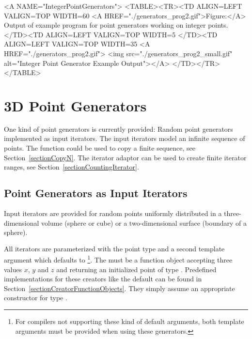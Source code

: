 
\begin{ccHtmlOnly}
  <A NAME="IntegerPointGenerators">
  <TABLE><TR><TD ALIGN=LEFT VALIGN=TOP WIDTH=60%
    <A HREF="./generators_prog2.gif">Figure:</A>
        Output of example program for point generators working
        on integer points.
  </TD><TD ALIGN=LEFT VALIGN=TOP WIDTH=5%
  </TD><TD ALIGN=LEFT VALIGN=TOP WIDTH=35%
    <A HREF="./generators_prog2.gif">
        <img src="./generators_prog2_small.gif" 
             alt="Integer Point Generator Example Output"></A>
  </TD></TR></TABLE>
\end{ccHtmlOnly}


\newpage
\section{3D Point Generators}

One kind of point generators is currently provided: Random point
generators implemented as input iterators.  The input iterators model
an infinite sequence of points. The function  could
be used to copy a finite sequence, see Section~\ref{sectionCopyN}. The
iterator adaptor  can be used to create
finite iterator ranges, see Section~\ref{sectionCountingIterator}.


\subsection{Point Generators as Input Iterators}

\ccDefinition

Input iterators are provided for random points uniformly distributed
in a three-dimensional volume (sphere or cube) or a two-dimensional
surface (boundary of a sphere).

All iterators are parameterized with the point type  and a second
template argument  which defaults to
\footnote{%
  For compilers not supporting these kind of default arguments, both
  template arguments must be provided when using these generators.}.
The  must be a function object accepting three
 values $x$, $y$ and $z$ and returning an initialized
point  of type . Predefined implementations for
these creators like the default can be found in
Section~\ref{sectionCreatorFunctionObjects}.  They simply assume an
appropriate constructor for type .

